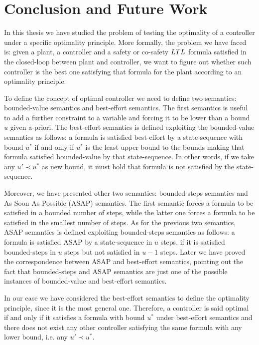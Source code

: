 \chapter{Conclusion and Future Work} \label{chapt:conclusion}

In this thesis we have studied the problem of testing the optimality of a controller under a specific optimality principle.
More formally, the problem we have faced is: given a plant, a controller and a safety or co-safety $LTL$ formula satisfied in the closed-loop between plant and controller, we want to figure out whether such controller is the best one satisfying that formula for the plant according to an optimality principle.

To define the concept of optimal controller we need to define two semantics: bounded-value semantics and best-effort semantics.
The first semantics is useful to add a further constraint to a variable and forcing it to be lower than a bound $u$ given a-priori.
The best-effort semantics is defined exploiting the bounded-value semantics as follows: a formula is satisfied best-effort by a state-sequence with bound $u^*$ if and only if $u^*$ is the least upper bound to the bounds making that formula satisfied bounded-value by that state-sequence.
In other words, if we take any $u' \prec u^*$ as new bound, it must hold that formula is not satisfied by the state-sequence.

Moreover, we have presented other two semantics: bounded-steps semantics and As Soon As Possible (ASAP) semantics.
The first semantic forces a formula to be satisfied in a bounded number of steps, while the latter one forces a formula to be satisfied in the smallest number of steps.
As for the previous two semantics, ASAP semantics is defined exploiting bounded-steps semantics as follows: a formula is satisfied ASAP by a state-sequence in $u$ steps, if it is satisfied bounded-steps in $u$ steps but not satisfied in $u-1$ steps.
Later we have proved the correspondence between ASAP and best-effort semantics, pointing out the fact that bounded-steps and ASAP semantics are just one of the possible instances of bounded-value and best-effort semantics.  

In our case we have considered the best-effort semantics to define the optimality principle, since it is the most general one. 
Therefore, a controller is said optimal if and only if it satisfies a formula with bound $u^*$ under best-effort semantics and there does not exist any other controller satisfying the same formula with any lower bound, i.e. any $u' \prec u^*$.

